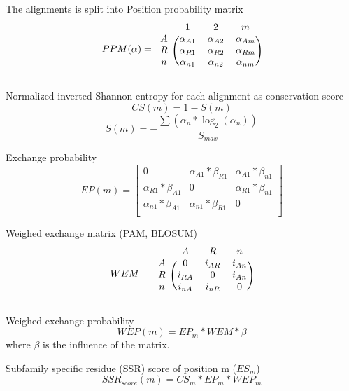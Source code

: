 \documentclass[12pt]{article}
\begin{document}
The alignments is split into Position probability matrix
\begin{equation}
PPM(\alpha) =
\begin{blockarray}{cccc}
 & 1 & 2  & m  \\
\begin{block}{c(ccc)}
  A & \alpha_{A1} & \alpha_{A2}  & \alpha_{Am} \\
  R & \alpha_{R1} & \alpha_{R2}  & \alpha_{Rm} \\
  n & \alpha_{n1} & \alpha_{n2}  & \alpha_{nm} \\
\end{block}
\end{blockarray}
\end{equation}

Normalized inverted Shannon entropy for each alignment 
as conservation score 
\begin{equation}
CS(m) = 1 - S(m) 
\end{equation}
\begin{equation}
S(m) = -\frac{\sum(\alpha_n*\log_2(\alpha_n))}{S_{max}}
\end{equation}

Exchange probability
\begin{equation}
EP(m) =
  \begin{bmatrix}
    0 & \alpha_{A1} * \beta_{R1} & \alpha_{A1} * \beta_{n1} \\
    \alpha_{R1} * \beta_{A1} & 0 & \alpha_{R1} * \beta_{n1} \\
    \alpha_{n1} * \beta_{A1} & \alpha_{n1} * \beta_{R1} & 0 \\
  \end{bmatrix}
\end{equation}

Weighed exchange matrix (PAM, BLOSUM)
\begin{equation}
WEM =
\begin{blockarray}{cccc}
 & A & R  & n  \\
\begin{block}{c(ccc)}
  A & 0 & i_{AR}  & i_{An} \\
  R & i_{RA} & 0  &  i_{An} \\
  n & i_{nA} &  i_{nR}  & 0 \\
\end{block}
\end{blockarray}
\end{equation}

Weighed exchange probability 
\begin{equation}
WEP(m) = EP_m * WEM * \beta
\end{equation}
where $\beta$ is the influence of the matrix.  

Subfamily specific residue (SSR) score of position m ($ES_m$)
\begin{equation}
SSR_{score}(m) = CS_m * EP_m * WEP_m 
\end{equation}
\end{document}
